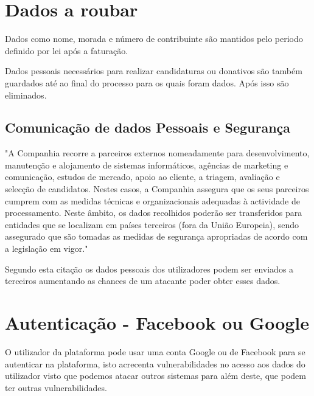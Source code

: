 \section{Dados a roubar}

\par Dados como nome, morada e número de contribuinte são mantidos pelo periodo definido por lei após a faturação.\newline

\par Dados pessoais necessários para realizar candidaturas ou donativos são também guardados até ao final do processo para os quais foram dados. Após isso são eliminados.


\subsection{Comunicação de dados Pessoais e Segurança}


\par "A Companhia recorre a parceiros externos nomeadamente para desenvolvimento, manutenção e alojamento de sistemas informáticos, agências de marketing e comunicação, estudos de mercado, apoio ao cliente, a triagem, avaliação e selecção de candidatos. Nestes casos, a Companhia assegura que os seus parceiros cumprem com as medidas técnicas e organizacionais adequadas à actividade de processamento. Neste âmbito, os dados recolhidos poderão ser transferidos para entidades que se localizam em países terceiros (fora da União Europeia), sendo assegurado que são tomadas as medidas de segurança apropriadas de acordo com a legislação em vigor."\newline


\par Segundo esta citação os dados pessoais dos utilizadores podem ser enviados a terceiros aumentando as chances de um atacante poder obter esses dados.


\section{Autenticação - Facebook ou Google}

\par O utilizador da plataforma pode usar uma conta Google ou de Facebook para se autenticar na plataforma, isto acrecenta vulnerabilidades no acesso aos dados do utilizador visto que podemos atacar outros sistemas para além deste, que podem ter outras vulnerabilidades.



